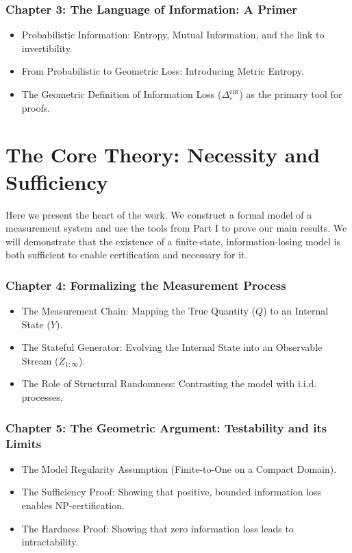 \documentclass[12pt]{article}
\begin{document}
\section*{Chapter 3: The Language of Information: A Primer}
\begin{itemize}
    \item Probabilistic Information: Entropy, Mutual Information, and the link to invertibility.
    \item From Probabilistic to Geometric Loss: Introducing Metric Entropy.
    \item The Geometric Definition of Information Loss ($\Delta^{\text{ent}}_\varepsilon$) as the primary tool for proofs.
\end{itemize}

\part{The Core Theory: Necessity and Sufficiency}
Here we present the heart of the work. We construct a formal model of a measurement system and use the tools from Part I to prove our main results. We will demonstrate that the existence of a finite-state, information-losing model is both sufficient to enable certification and necessary for it.

\section*{Chapter 4: Formalizing the Measurement Process}
\begin{itemize}
    \item The Measurement Chain: Mapping the True Quantity ($Q$) to an Internal State ($Y$).
    \item The Stateful Generator: Evolving the Internal State into an Observable Stream ($Z_{1:\infty}$).
    \item The Role of Structural Randomness: Contrasting the model with i.i.d. processes.
\end{itemize}

\section*{Chapter 5: The Geometric Argument: Testability and its Limits}
\begin{itemize}
    \item The Model Regularity Assumption (Finite-to-One on a Compact Domain).
    \item The Sufficiency Proof: Showing that positive, bounded information loss enables NP-certification.
    \item The Hardness Proof: Showing that zero information loss leads to intractability.
\end{itemize}
\end{document}
